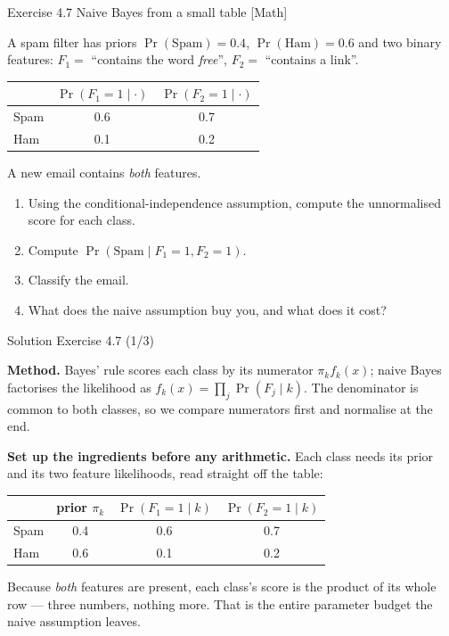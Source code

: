 \documentclass[aspectratio=169,11pt]{beamer}
\begin{document}
\begin{frame}{Exercise 4.7 \textemdash{} Naive Bayes from a small table [Math]}
\begin{exercise}
A spam filter has priors $\Pr(\text{Spam})=0.4$, $\Pr(\text{Ham})=0.6$
and two binary features: $F_1=$ ``contains the word \emph{free}'',
$F_2=$ ``contains a link''.
\begin{center}\small
\begin{tabular}{lcc}
\toprule
 & $\Pr(F_1=1\mid\cdot)$ & $\Pr(F_2=1\mid\cdot)$ \\
\midrule
Spam & 0.6 & 0.7 \\
Ham  & 0.1 & 0.2 \\
\bottomrule
\end{tabular}
\end{center}
A new email contains \emph{both} features.
\begin{enumerate}
  \item Using the conditional-independence assumption, compute the
        unnormalised score for each class.
  \item Compute $\Pr(\text{Spam}\mid F_1=1,F_2=1)$.
  \item Classify the email.
  \item What does the naive assumption buy you, and what does it cost?
\end{enumerate}
\end{exercise}
\end{frame}

\begin{frame}{Solution \textemdash{} Exercise 4.7 (1/3)}
\begin{solutionbox}
\textbf{Method.} Bayes' rule scores each class by its numerator
$\pi_k f_k(x)$; naive Bayes factorises the likelihood as
$f_k(x)=\prod_j\Pr(F_j\mid k)$. The denominator is common to both
classes, so we compare numerators first and normalise at the end.

\medskip
\textbf{Set up the ingredients before any arithmetic.} Each class needs
its prior and its two feature likelihoods, read straight off the table:
\begin{center}\small
\begin{tabular}{lccc}
\toprule
 & prior $\pi_k$ & $\Pr(F_1{=}1\mid k)$ & $\Pr(F_2{=}1\mid k)$ \\
\midrule
Spam & 0.4 & 0.6 & 0.7 \\
Ham  & 0.6 & 0.1 & 0.2 \\
\bottomrule
\end{tabular}
\end{center}
Because \emph{both} features are present, each class's score is the
product of its whole row --- three numbers, nothing more. That is the
entire parameter budget the naive assumption leaves.
\end{solutionbox}
\end{frame}
\end{document}
